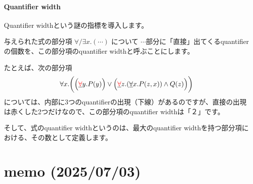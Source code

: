 \documentclass[a4paper,UKenglish,cleveref, autoref, thm-restate]{lipics-v2021}
\newenvironment{Jcomment}%
{\begin{screen}\begin{CJK}{UTF8}{ipxm}}%
{\end{CJK}\end{screen}}
\begin{document}
\paragraph*{Quantifier width}
\begin{Jcomment}
Quantifier widthという謎の指標を導入します。

与えられた式の部分項 $\forall/\exists x. ( \cdots )$ について $\cdots$部分に「直接」出てくるquantifierの個数を、この部分項のquantifier widthと呼ぶことにします。

たとえば、次の部分項
$$
\forall x.\biggl( \Bigl(\underline{{\color{red}\forall}} y. P(y)\Bigr) \lor \Bigl(\underline{{\color{red}\forall}} z. (\underline{\forall} x. P(z, x)) \land Q(z)\Bigr) \biggr)
$$
については、内部に3つのquantifierの出現（下線）があるのですが、直接の出現は赤くした2つだけなので、この部分項のquantifier widthは「２」です。

そして、式のquantifier widthというのは、最大のquantifier widthを持つ部分項における、その数として定義します。
\end{Jcomment}










\section{memo (2025/07/03)}





\end{document}

